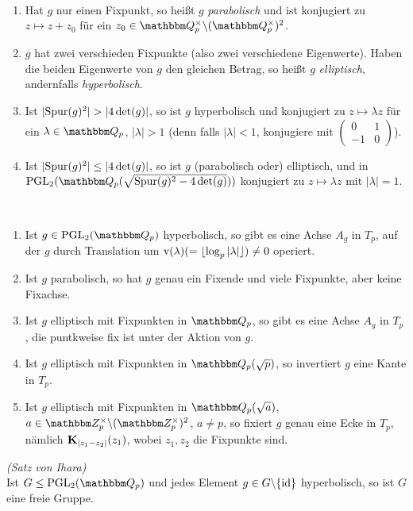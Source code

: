 \documentclass[a4paper, 12pt, twoside]{article}
\begin{document}
\DB\ \begin{enumerate}
\item Hat $g$ nur einen Fixpunkt, so heißt $g$
\emph{parabolisch} und ist konjugiert zu
$z\mapsto z+z_0$ für ein
$z_0\in\QQ_p^\times\backslash(\QQ_p^\times)^2$.
\item $g$ hat zwei verschieden Fixpunkte (also zwei
verschiedene Eigenwerte).
Haben die beiden Eigenwerte von $g$ den gleichen Betrag, so
heißt $g$ \emph{elliptisch}, andernfalls
\emph{hyperbolisch}.
\item Ist $|\spur(g)^2|>|4\det(g)|$, so ist $g$
hyperbolisch und konjugiert zu $z\mapsto\lambda z$ für ein
$\lambda\in\QQ_p$, $|\lambda|>1$ (denn falls $|\lambda|<1$,
konjugiere mit $\begin{pmatrix}0&1\\ -1&0\end{pmatrix}$).
\item Ist $|\mathrm{Spur}(g)^2|\leq |4\det(g)|$, so ist $g$
(parabolisch oder) elliptisch, und in\\
$\PGL_2(\QQ_p(\sqrt{\spur(g)^2-4\det(g)}))$ konjugiert
zu $z\mapsto \lambda z$ mit $|\lambda|=1$.
\end{enumerate}

\BEM\ \label{bem_hep}
\begin{enumerate}
\item Ist $g\in\PGL_2(\QQ_p)$ hyperbolisch, so gibt es eine
Achse $A_g$ in $T_p$, auf der $g$ durch Translation um
$\mathrm{v}(\lambda)(=\lfloor\log_p|\lambda|\rfloor)\neq 0$ operiert.
\item Ist $g$ parabolisch, so hat $g$ genau ein Fixende
und viele Fixpunkte, aber keine Fixachse.
\item Ist $g$ elliptisch mit Fixpunkten in $\QQ_p$, so gibt es
eine Achse $A_g$ in $T_p$, die puntkweise fix ist unter
der Aktion von $g$.
\item Ist $g$ elliptisch mit Fixpunkten in $\QQ_p(\sqrt{p})$,
so invertiert $g$ eine Kante in $T_p$.
\item Ist $g$ elliptisch mit Fixpunkten in $\QQ_p(\sqrt{a})$,
$a\in\ZZ_p^\times\backslash(\ZZ_p^\times)^2$, $a\neq p$,
so fixiert $g$
genau eine Ecke in $T_p$, nämlich $\mathbf{K}_{|z_1-z_2|}(z_1)$, wobei
$z_1, z_2$ die Fixpunkte sind.
\end{enumerate}

\SATZ\label{satz_ihara} \emph{(Satz von Ihara)}\\
Ist $G\leq\PGL_2(\QQ_p)$ und jedes Element
$g\in G\backslash\{\mathrm{id}\}$ hyperbolisch,
so ist $G$ eine freie Gruppe.
\end{document}
